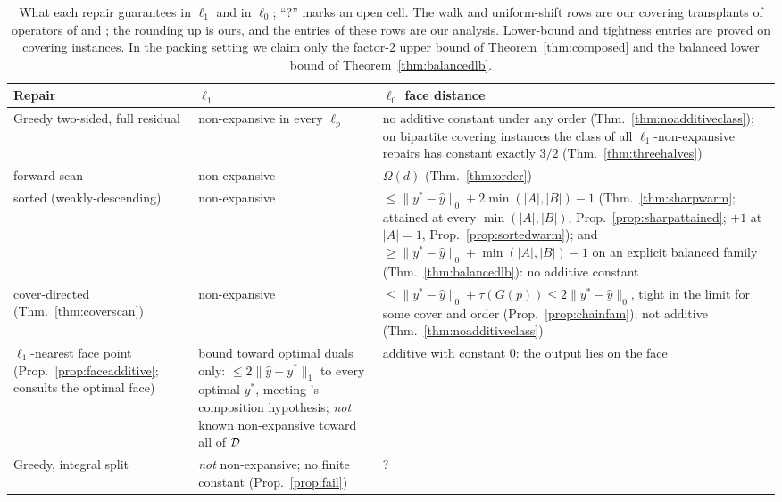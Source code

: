 \makeatletter\setlength{\@fptop}{0pt}\makeatother
\begin{table}[!htbp]
\centering
\caption{What each repair guarantees in $\ell_1$ and in $\ell_0$; ``$?$'' marks an open cell. The
walk and uniform-shift rows are our covering transplants of operators of \citet{dinitz2021} and
\citet{sakaue2022,sakaue2023}; the rounding up is ours, and the entries of these rows are our analysis.
Lower-bound and tightness entries are proved on covering instances. In the packing setting we claim
only the factor-$2$ upper bound of Theorem~\ref{thm:composed} and the balanced lower bound of
Theorem~\ref{thm:balancedlb}.}
\label{tab:zoo}
\footnotesize
\setlength{\tabcolsep}{4pt}\begin{tabular}{@{}p{2.8cm} p{3.8cm} p{6.6cm}@{}}
\toprule
Repair & $\ell_1$ & $\ell_0$ face distance\\
\midrule
\raggedright Greedy two-sided, full residual & \raggedright non-expansive in every $\ell_p$ & \raggedright no additive constant under any order (Thm.~\ref{thm:noadditiveclass}); on bipartite covering instances the class of all $\ell_1$-non-expansive repairs has constant exactly $3/2$ (Thm.~\ref{thm:threehalves})\tabularnewline
\raggedright \quad forward scan & \raggedright non-expansive & \raggedright $\Omega(d)$ (Thm.~\ref{thm:order})\tabularnewline
\raggedright \quad sorted (weakly-descending) & \raggedright non-expansive & \raggedright $\le \|y^*{-}\hat y\|_0 + 2\min(|A|,|B|){-}1$ (Thm.~\ref{thm:sharpwarm}; attained at every $\min(|A|,|B|)$, Prop.~\ref{prop:sharpattained}; ${+}1$ at $|A|{=}1$, Prop.~\ref{prop:sortedwarm}); and $\ge \|y^*{-}\hat y\|_0 + \min(|A|,|B|){-}1$ on an explicit balanced family (Thm.~\ref{thm:balancedlb}): no additive constant\tabularnewline
\raggedright \quad cover-directed (Thm.~\ref{thm:coverscan}) & \raggedright non-expansive & \raggedright $\le \|y^*{-}\hat y\|_0 + \tau(G(p)) \le 2\|y^*{-}\hat y\|_0$, tight in the limit for some cover and order (Prop.~\ref{prop:chainfam}); not additive (Thm.~\ref{thm:noadditiveclass})\tabularnewline
\raggedright $\ell_1$-nearest face point (Prop.~\ref{prop:faceadditive}; consults the optimal face) & \raggedright bound toward optimal duals only: $\le 2\|\hat y{-}y^*\|_1$ to every optimal $y^*$, meeting \citeauthor{chen2022}'s composition hypothesis; \emph{not} known non-expansive toward all of $\mathcal{D}$ & \raggedright additive with constant $0$: the output lies on the face\tabularnewline
\raggedright Greedy, integral split & \raggedright \emph{not} non-expansive; no finite constant (Prop.~\ref{prop:fail}) & \raggedright $?$\tabularnewline

\end{tabular}
\end{table}
